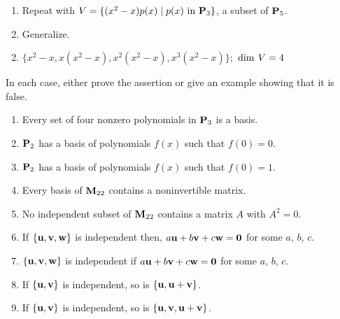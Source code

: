 \begin{multicols}{2}
\begin{ex}
\begin{enumerate}[label={\alph*.}]
\item Repeat with $V = \{(x^{2} - x)p(x) \mid p(x) \mbox{ in } \textbf{P}_{3}\}$, a subset of $\textbf{P}_{5}$.

\item Generalize.

\end{enumerate}
\begin{sol}
\begin{enumerate}[label={\alph*.}]
\setcounter{enumi}{1}
\item  $\{x^{2} - x, x(x^{2} - x), x^{2}(x^{2} - x), x^{3}(x^{2} - x)\}$; $\thinspace\operatorname{dim\medspace} V = 4$

\end{enumerate}
\end{sol}
\end{ex}

\begin{ex}
In each case, either prove the assertion or give an example showing that it is false.

\begin{enumerate}[label={\alph*.}]
\item Every set of four nonzero polynomials in $\textbf{P}_{3}$ is a basis.

\item $\textbf{P}_{2}$ has a basis of polynomials $f(x)$ such that $f(0) = 0$.

\item $\textbf{P}_{2}$ has a basis of polynomials $f(x)$ such that $f(0) = 1$.

\item Every basis of $\textbf{M}_{22}$ contains a noninvertible matrix.

\item No independent subset of $\textbf{M}_{22}$ contains a matrix $A$ with $A^{2} = 0$.

\item If $\{\textbf{u}, \textbf{v}, \textbf{w}\}$ is independent then, $a\textbf{u} + b\textbf{v} + c\textbf{w} = \textbf{0}$ for some $a$, $b$, $c$.

\item $\{\textbf{u}, \textbf{v}, \textbf{w}\}$ is independent if $a\textbf{u} + b\textbf{v} + c\textbf{w} = \textbf{0}$ for some $a$, $b$, $c$.

\item If $\{\textbf{u}, \textbf{v}\}$ is independent, so is $\{\textbf{u}, \textbf{u} + \textbf{v}\}$.

\item If $\{\textbf{u}, \textbf{v}\}$ is independent, so is $\{\textbf{u}, \textbf{v}, \textbf{u} + \textbf{v}\}$.


\end{enumerate}
\end{ex}
\end{multicols}
